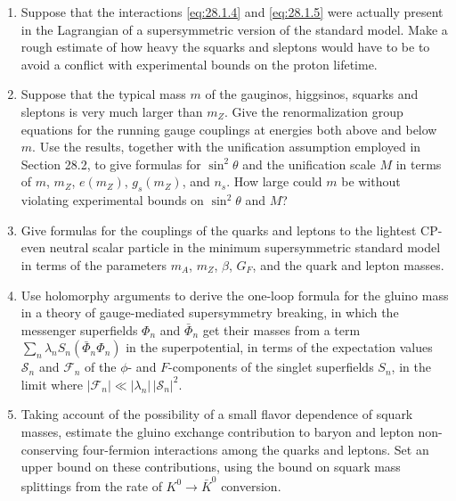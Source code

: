 

\begin{enumerate}
  \item Suppose that the interactions \eqref{eq:28.1.4} and
  \eqref{eq:28.1.5} were actually present in the Lagrangian of a
  supersymmetric version of the standard model. Make a rough estimate
  of how heavy the squarks and sleptons would have to be to avoid a
  conflict with experimental bounds on the proton lifetime.

  \item Suppose that the typical mass $m$ of the gauginos, higgsinos,
  squarks and sleptons is very much larger than $m_Z$. Give the
  renormalization group equations for the running gauge couplings at
  energies both above and below $m$. Use the results, together with the
  unification assumption employed in Section 28.2, to give formulas for
  $\sin^2\theta$ and the unification scale $M$ in terms of $m$, $m_Z$,
  $e(m_Z)$, $g_s(m_Z)$, and $n_s$. How large could $m$ be without
  violating experimental bounds on $\sin^2\theta$ and $M$?

  \item Give formulas for the couplings of the quarks and leptons to
  the lightest CP-even neutral scalar particle in the minimum
  supersymmetric standard model in terms of the parameters $m_A$,
  $m_Z$, $\beta$, $G_F$, and the quark and lepton masses.

  \item Use holomorphy arguments to derive the one-loop formula for the
  gluino mass in a theory of gauge-mediated supersymmetry breaking, in
  which the messenger superfields $\Phi_n$ and $\bar\Phi_n$ get their
  masses from a term
  $\sum_n\lambda_nS_n(\bar\Phi_n\Phi_n)$ in the superpotential, in terms
  of the expectation values $\mathcal{S}_n$ and $\mathcal{F}_n$ of the
  $\phi$- and $F$-components of the singlet superfields $S_n$, in the
  limit where
  $|\mathcal{F}_n|\ll|\lambda_n|\,|\mathcal{S}_n|^2$.

  \item Taking account of the possibility of a small flavor dependence
  of squark masses, estimate the gluino exchange contribution to baryon
  and lepton non-conserving four-fermion interactions among the quarks
  and leptons. Set an upper bound on these contributions, using the
  bound on squark mass splittings from the rate of
  $K^0\longrightarrow\bar K^0$ conversion.
\end{enumerate}

